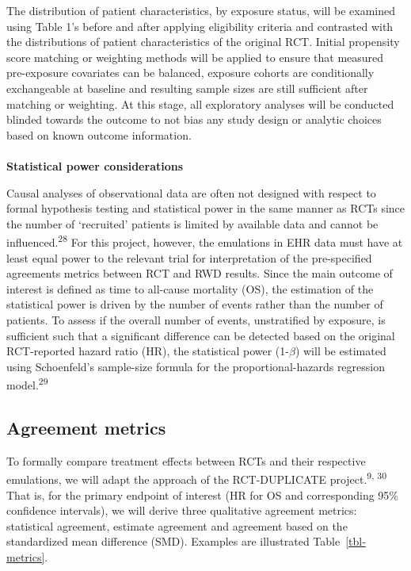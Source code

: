 \documentclass[
  letterpaper,
  DIV=11,
  numbers=noendperiod]{scrartcl}
\makeatletter
\let\oldparagraph\paragraph
\renewcommand{\paragraph}{
    \@ifstar
      \xxxParagraphStar
      \xxxParagraphNoStar
  }
\newcommand{\xxxParagraphStar}[1]{\oldparagraph*{#1}\mbox{}}
\newcommand{\xxxParagraphNoStar}[1]{\oldparagraph{#1}\mbox{}}
\makeatother
\begin{document}
The distribution of patient characteristics, by exposure status, will be
examined using Table 1's before and after applying eligibility criteria
and contrasted with the distributions of patient characteristics of the
original RCT. Initial propensity score matching or weighting methods
will be applied to ensure that measured pre-exposure covariates can be
balanced, exposure cohorts are conditionally exchangeable at baseline
and resulting sample sizes are still sufficient after matching or
weighting. At this stage, all exploratory analyses will be conducted
blinded towards the outcome to not bias any study design or analytic
choices based on known outcome information.

\paragraph{\texorpdfstring{\textbf{Statistical power
considerations}}{Statistical power considerations}}\label{statistical-power-considerations}

Causal analyses of observational data are often not designed with
respect to formal hypothesis testing and statistical power in the same
manner as RCTs since the number of `recruited' patients is limited by
available data and cannot be influenced.\textsuperscript{28} For this
project, however, the emulations in EHR data must have at least equal
power to the relevant trial for interpretation of the pre-specified
agreements metrics between RCT and RWD results. Since the main outcome
of interest is defined as time to all-cause mortality (OS), the
estimation of the statistical power is driven by the number of events
rather than the number of patients. To assess if the overall number of
events, unstratified by exposure, is sufficient such that a significant
difference can be detected based on the original RCT-reported hazard
ratio (HR), the statistical power (1-\(\beta\)) will be estimated using
Schoenfeld's sample-size formula for the proportional-hazards regression
model.\textsuperscript{29}

\subsection{Agreement metrics}\label{sec-agreement-metrics}

To formally compare treatment effects between RCTs and their respective
emulations, we will adapt the approach of the RCT-DUPLICATE
project.\textsuperscript{9, 30} That is, for the primary endpoint of
interest (HR for OS and corresponding 95\% confidence intervals), we
will derive three qualitative agreement metrics: statistical agreement,
estimate agreement and agreement based on the standardized mean
difference (SMD). Examples are illustrated Table~\ref{tbl-metrics}.
\end{document}
